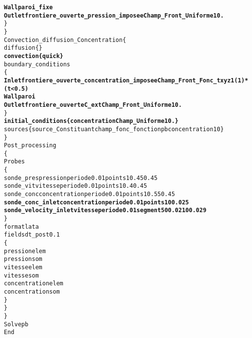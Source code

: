 \begin{alltt}
            {\bf{Wall    paroi_fixe}}
            {\bf{Outlet  frontiere_ouverte_pression_imposee Champ_Front_Uniforme 1 0.}}
        \}
    \}
    Convection_diffusion_Concentration \{
        diffusion \{ \}
        {\bf{convection \{ quick \} }}
        boundary_conditions 
        \{
            {\bf{Inlet   frontiere_ouverte_concentration_imposee Champ_Front_Fonc_txyz 1 (1)*(t<0.5)}}
            {\bf{Wall    paroi}}
            {\bf{Outlet  frontiere_ouverte C_ext Champ_Front_Uniforme 1 0.}}
        \}
        {\bf{initial_conditions \{ concentration Champ_Uniforme 1 0. \} }}
        sources \{ source_Constituant champ_fonc_fonction pb concentration 1 0 \}
    \}
    Post_processing
    \{
        Probes
        \{
            sonde_pres pression periode 0.01 points 1 0.45 0.45
            sonde_vit vitesse periode 0.01 points 1 0.4 0.45
            sonde_conc concentration periode 0.01 points 1 0.55 0.45
            {\bf{sonde_conc_inlet concentration periode 0.01 points 1 0 0.025 }}
            {\bf{sonde_velocity_inlet vitesse periode 0.01 segment 5 0 0.021 0 0.029}}
        \}
        format lata
        fields dt_post 0.1
        \{
            pression elem
            pression som
            vitesse elem
            vitesse som
            concentration elem
            concentration som
        \}
    \}
\}
Solve pb
End
\end{alltt}
